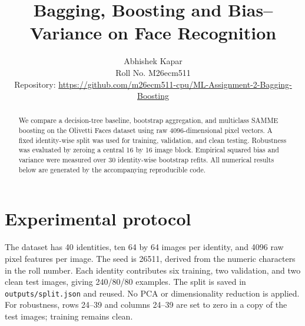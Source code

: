 \documentclass[10pt,twocolumn,letterpaper]{article}
\title{Bagging, Boosting and Bias--Variance on Face Recognition}
\author{Abhishek Kapar\\Roll No. M26ecm511\\Repository: \url{https://github.com/m26ecm511-cpu/ML-Assignment-2-Bagging-Boosting}}\date{}
\begin{document}
\maketitle
\begin{abstract}
We compare a decision-tree baseline, bootstrap aggregation, and multiclass SAMME boosting on the Olivetti Faces dataset using raw 4096-dimensional pixel vectors. A fixed identity-wise split was used for training, validation, and clean testing. Robustness was evaluated by zeroing a central 16 by 16 image block. Empirical squared bias and variance were measured over 30 identity-wise bootstrap refits. All numerical results below are generated by the accompanying reproducible code.
\end{abstract}
\section{Experimental protocol}
The dataset has 40 identities, ten 64 by 64 images per identity, and 4096 raw pixel features per image. The seed is 26511, derived from the numeric characters in the roll number. Each identity contributes six training, two validation, and two clean test images, giving 240/80/80 examples. The split is saved in \texttt{outputs/split.json} and reused. No PCA or dimensionality reduction is applied. For robustness, rows 24--39 and columns 24--39 are set to zero in a copy of the test images; training remains clean.
\end{document}
